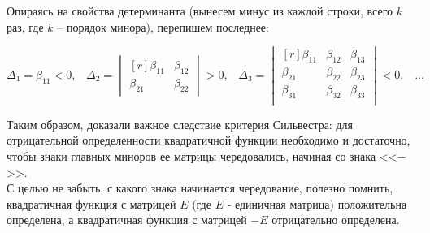 Опираясь на свойства детерминанта (вынесем минус из каждой строки, всего $k$ раз, где $k$ -- порядок минора), перепишем последнее:

$$\Delta_1=\beta_{11}<0,\hspace{10pt} \Delta_2=\begin{vmatrix*}[r]
\beta_{11} & \beta_{12} \\
\beta_{21} & \beta_{22}
\end{vmatrix*}>0, \hspace{10pt}\Delta_3=\begin{vmatrix*}[r]
\beta_{11} & \beta_{12} & \beta_{13}\\
\beta_{21} & \beta_{22} & \beta_{23}\\
\beta_{31} & \beta_{32} & \beta_{33}\\
\end{vmatrix*}<0, \hspace{10pt}\ldots $$

Таким образом, доказали важное следствие критерия Сильвестра: для отрицательной определенности квадратичной функции необходимо и достаточно, чтобы знаки главных миноров ее матрицы чередовались, начиная со знака <<$-$>>.\\

С целью не забыть, с какого знака начинается чередование, полезно помнить, квадратичная функция с матрицей $E$ (где $E$ - единичная матрица) положительна определена, а квадратичная функция с матрицей $-E$ отрицательно определена.